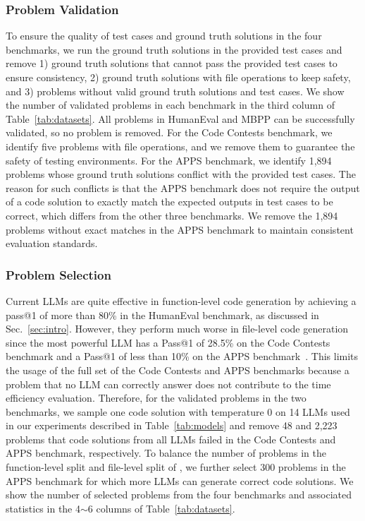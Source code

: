 \subsubsection{Problem Validation}
To ensure the quality of test cases and ground truth solutions in the four benchmarks, we run the ground truth solutions in the provided test cases and remove 1) ground truth solutions that cannot pass the provided test cases to ensure consistency, 2) ground truth solutions with file operations to keep safety, and 3) problems without valid ground truth solutions and test cases. We show the number of validated problems in each benchmark in the third column of Table~\ref{tab:datasets}. All problems in HumanEval and MBPP can be successfully validated, so no problem is removed. For the Code Contests benchmark, we identify five problems with file operations, and we remove them to guarantee the safety of testing environments. For the APPS benchmark, we identify 1,894 problems whose ground truth solutions conflict with the provided test cases. The reason for such conflicts is that the APPS benchmark does not require the output of a code solution to exactly match the expected outputs in test cases to be correct, which differs from the other three benchmarks. We remove the 1,894 problems without exact matches in the APPS benchmark to maintain consistent evaluation standards.

\subsubsection{Problem Selection}
Current LLMs are quite effective in function-level code generation by achieving a pass@1 of more than 80\% in the HumanEval benchmark, as discussed in Sec.~\ref{sec:intro}. However, they perform much worse in file-level code generation since the most powerful LLM has a Pass@1 of 28.5\% on the Code Contests benchmark and a Pass@1 of less than 10\% on the APPS benchmark~\cite{codecontestleaderboard,appspsc}. This limits the usage of the full set of the Code Contests and APPS benchmarks because a problem that no LLM can correctly answer does not contribute to the time efficiency evaluation.
Therefore, for the validated problems in the two benchmarks, we sample one code solution with temperature 0 on 14 LLMs used in our experiments described in Table~\ref{tab:models} and remove 48 and 2,223 problems that code solutions from all LLMs failed in the Code Contests and APPS benchmark, respectively. To balance the number of problems in the function-level split and file-level split of \bench, we further select 300 problems in the APPS benchmark for which more LLMs can generate correct code solutions. We show the number of selected problems from the four benchmarks and associated statistics in the 4$\sim$6 columns of Table~\ref{tab:datasets}.



